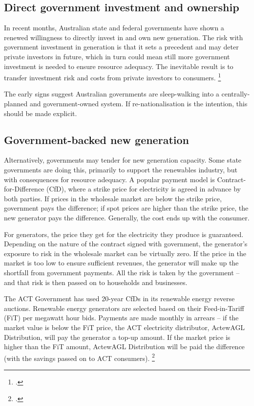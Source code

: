 \documentclass[FrontPage]{grattan}
\begin{document}
\subsection{Direct government investment and ownership}\label{subsec:direct-government-investment}
In recent months, Australian state and federal governments have shown a renewed willingness to directly invest in and own new generation. The risk with government investment in generation is that it sets a precedent and may deter private investors in future, which in turn could mean still more government investment is needed to ensure resource adequacy. The inevitable result is to transfer investment risk and costs from private investors to consumers.%
\footcite{WoodBlowers-2017-Powering-Through}

The early signs suggest Australian governments are sleep-walking into a centrally-planned and government-owned system. If re-nationalisation is the intention, this should be made explicit.

\subsection{Government-backed new generation}\label{subsec:government-backed-new-generation} 
Alternatively, governments may tender for new generation capacity. Some state governments are doing this, primarily to support the renewables industry, but with consequences for resource adequacy. A popular payment model is Contract-for-Difference (CfD), where a strike price for electricity is agreed in advance by both parties. If prices in the wholesale market are below the strike price, government pays the difference; if spot prices are higher than the strike price, the new generator pays the difference. Generally, the cost ends up with the consumer.

For generators, the price they get for the electricity they produce is guaranteed. Depending on the nature of the contract signed with government, the generator's exposure to risk in the wholesale market can be virtually zero. If the price in the market is too low to ensure sufficient revenues, the generator will make up the shortfall from government payments. All the risk is taken by the government -- and that risk is then passed on to households and businesses.

The ACT Government has used 20-year CfDs in its renewable energy reverse auctions. Renewable energy generators are selected based on their Feed-in-Tariff (FiT) per megawatt hour bids. Payments are made monthly in arrears -- if the market value is below the FiT price, the ACT electricity distributor, ActewAGL Distribution, will pay the generator a top-up amount. If the market price is higher than the FiT amount, ActewAGL Distribution will be paid the difference (with the savings passed on to ACT consumers).%
\footcite{ACTrenewablesauctions2016}
\end{document}
